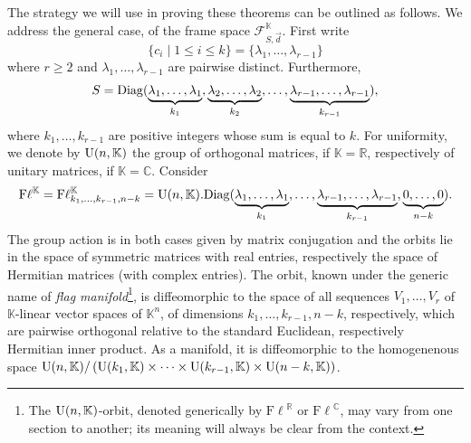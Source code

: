 \documentclass[12pt]{amsart}
\theoremstyle{definition}
\theoremstyle{remark}
\newcommand{\RR}{\mathbb R}
\newcommand{\CC}{\mathbb C}
\newcommand{\KK}{\mathbb K}
\newcommand{\Fl}{{\mathrm{F\ell}}}
\begin{document}
The strategy we will use in proving these theorems can be outlined as follows. We address the general case, of the frame space
${\mathcal F}_{S, \vec{d}}^\KK$.  First write 
$$\{c_i \mid 1 \le i \le k\} = \{\lambda_1, \ldots, \lambda_{r-1}\}$$
where $r\ge2$ and $\lambda_1, \ldots, \lambda_{r-1}$ are pairwise distinct.  Furthermore,
$$S={\rm Diag}(\underbrace{\lambda_1 , \dots, \lambda_1}_{k_1},
\underbrace{\lambda_2, \dots, \lambda_2}_{k_2},
\dots,
\underbrace{\lambda_{r-1}, \dots, \lambda_{r-1}}_{k_{r-1}}),$$
where $k_1, \ldots, k_{r-1}$ are positive integers whose sum is equal to $k$. 
For uniformity, we denote by ${\rm U}(n,\KK)$ the group of orthogonal matrices, if $\KK=\RR$, respectively of unitary matrices, if $\KK=\CC$. 
Consider 
$${\rm F}\ell^\KK={\rm F}\ell_{k_1,\ldots, k_{r-1}, n-k}^\KK
= {\rm U}(n,\KK) .{\rm Diag}(\underbrace{\lambda_1 , \dots, \lambda_1}_{k_1},
\dots,
\underbrace{\lambda_{r-1}, \dots, \lambda_{r-1}}_{k_{r-1}}, \underbrace{0 , \dots, 0}_{n-k}).$$
        The group action is in both cases given by matrix conjugation and the orbits lie in the space of symmetric matrices with real entries,
        respectively the space of Hermitian matrices (with complex entries). The orbit, known under the generic name of {\it flag manifold}\footnote{The ${\rm U}(n,\KK)$-orbit, denoted generically by $\Fl^\RR$ or $\Fl^\CC$, may vary from one section to another; its meaning will always be clear from the context.}, is diffeomorphic to the space of all sequences $V_1,\ldots, V_r$ of $\KK$-linear vector spaces of $\KK^n$, of dimensions $k_1, \ldots, k_{r-1}, n-k$, respectively, which are pairwise orthogonal relative to the standard Euclidean, respectively Hermitian inner product. As a manifold, it is diffeomorphic to the homogenenous space ${\rm U}(n, \KK)/\left({\rm U}(k_1, \KK)\times \cdots \times {\rm U}(k_{r-1}, \KK)
        \times {\rm U}(n-k, \KK)\right)$. 
        
\end{document}
